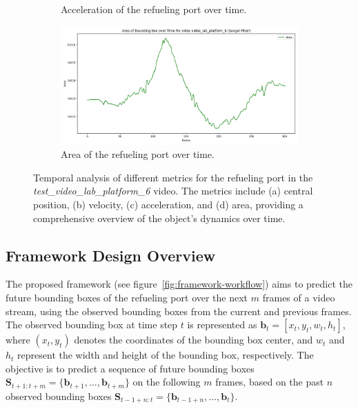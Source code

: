 \documentclass[12pt,oneside]{book} %
\begin{document}
\begin{figure}[H]
\begin{subfigure}[t]{0.6\textwidth}
        \caption{Acceleration of the refueling port over time.}
        \label{fig:acceleration-test-video_lab_platform_6-savgol}
    \end{subfigure}
    \hfill
    \begin{subfigure}[t]{0.6\textwidth}
        \includegraphics[width=\textwidth]{figures/bbox_metrics/video_lab_platform_6 (Savgol Filter)_area.png}
        \caption{Area of the refueling port over time.}
        \label{fig:size-test-video_lab_platform_6-savgol}
    \end{subfigure}
    \caption{Temporal analysis of different metrics for the refueling port in the \textit{test\_video\_lab\_platform\_6} video. The metrics include (a) central position, (b) velocity, (c) acceleration, and (d) area, providing a comprehensive overview of the object's dynamics over time.}
    \label{fig:bbox-metrics-test-video_lab_platform_6-savgol}
\end{figure}

\subsection{Framework Design Overview}
The proposed framework (see figure~\ref{fig:framework-workflow}) aims to
predict the future bounding boxes of the refueling port over the next \(m\)
frames of a video stream, using the observed bounding boxes from the current
and previous frames. The observed bounding box at time step \(t\) is
represented as \(\mathbf{b}_t = [x_t, y_t, w_t, h_t]\), where \((x_t, y_t)\)
denotes the coordinates of the bounding box center, and \(w_t\) and \(h_t\)
represent the width and height of the bounding box, respectively. The objective
is to predict a sequence of future bounding boxes \(\mathbf{S}_{t+1:t+m} =
\{\mathbf{b}_{t+1}, \dots, \mathbf{b}_{t+m}\}\) on the following \(m\) frames,
based on the past \(n\) observed bounding boxes \(\mathbf{S}_{t-1+n:t} =
\{\mathbf{b}_{t-1+n}, \dots, \mathbf{b}_{t}\}\). 
\end{document}

